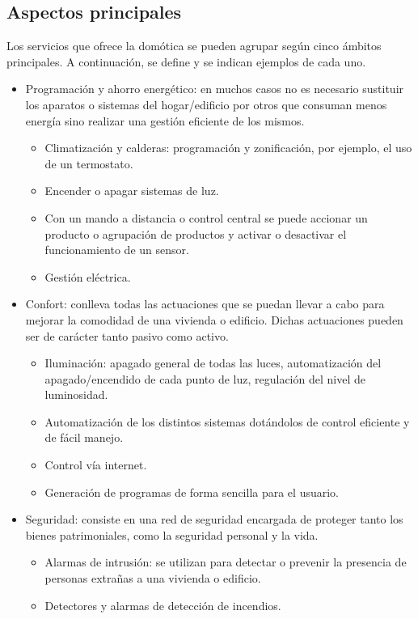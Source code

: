 \subsection{Aspectos principales}

Los servicios que ofrece la domótica se pueden agrupar según cinco ámbitos principales. A continuación, se define y se indican ejemplos de cada uno.

\begin{itemize}
\item Programación y ahorro energético: en muchos casos no es necesario sustituir los aparatos o sistemas del hogar/edificio por otros que consuman menos energía sino realizar una gestión eficiente de los mismos.
\begin{itemize}
\item Climatización y calderas: programación y zonificación, por ejemplo, el uso de un termostato.
\item Encender o apagar sistemas de luz.
\item Con un mando a distancia o control central se puede accionar un producto o agrupación de productos y activar o desactivar el funcionamiento de un sensor.
\item Gestión eléctrica.
\end{itemize}
\item Confort: conlleva todas las actuaciones que se puedan llevar a cabo para mejorar la comodidad de una vivienda o edificio. Dichas actuaciones pueden ser de carácter tanto pasivo como activo.
\begin{itemize}
\item Iluminación: apagado general de todas las luces, automatización del apagado/encendido de cada punto de luz, regulación del nivel de luminosidad.
\item Automatización de los distintos sistemas dotándolos de control eficiente y de fácil manejo.
\item Control vía internet.
\item Generación de programas de forma sencilla para el usuario.
\end{itemize}
\item Seguridad: consiste en una red de seguridad encargada de proteger tanto los bienes patrimoniales, como la seguridad personal y la vida.
\begin{itemize}
\item Alarmas de intrusión: se utilizan para detectar o prevenir la presencia de personas extrañas a una vivienda o edificio.
\item Detectores y alarmas de detección de incendios.

\end{itemize}
\end{itemize}
